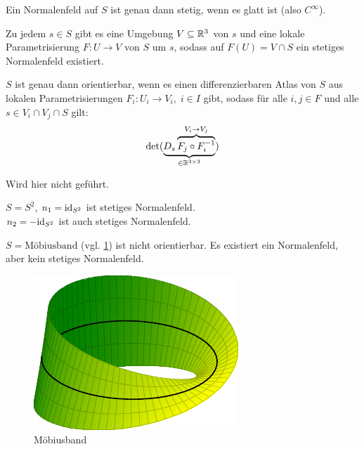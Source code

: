 \begin{bemerkung}%
    \begin{bemenum}
        \item Ein Normalenfeld auf $S$ ist genau dann stetig, wenn es
              glatt ist (also $C^\infty$).
        \item Zu jedem $s \in S$ gibt es eine Umgebung $V \subseteq \mathbb{R}^3$
              von $s$ und eine lokale Parametrisierung $F: U \rightarrow V$
              von $S$ um $s$, sodass auf $F(U) = V \cap S$
              ein stetiges Normalenfeld existiert.
        \item $S$ ist genau dann orientierbar, wenn es einen 
              differenzierbaren Atlas von $S$ aus lokalen Parametrisierungen
              $F_i: U_i \rightarrow V_i,\;i \in I$ gibt, sodass
              für alle $i, j \in F$ und alle $s \in V_i \cap V_j \cap S$
              gilt:
              \[\det(\underbrace{D_s \overbrace{F_j \circ F_i^{-1}}^{V_i \rightarrow V_j}}_{\in \mathbb{R}^{3 \times 3}})\]
    \end{bemenum}
\end{bemerkung}

\begin{beweis}
    Wird hier nicht geführt.%
\end{beweis}

\begin{beispiel}
    \begin{bspenum}
        \item $S = S^2$, $n_1 = \textnormal{id}_{S^2}$ ist stetiges Normalenfeld.\\
              $n_2 = - \textnormal{id}_{S^2}$ ist auch stetiges Normalenfeld.
        \item $S = \text{Möbiusband}$ (vgl. \cref{fig:moebius-strip})
              ist nicht orientierbar. Es existiert ein Normalenfeld,
              aber kein stetiges Normalenfeld.
    \end{bspenum}
\end{beispiel}

\begin{figure}[htp]
    \centering
    \includegraphics[width=0.5\linewidth, keepaspectratio]{figures/moebius-strip.pdf} 
    \caption{Möbiusband}
    \label{fig:moebius-strip}
\end{figure}


